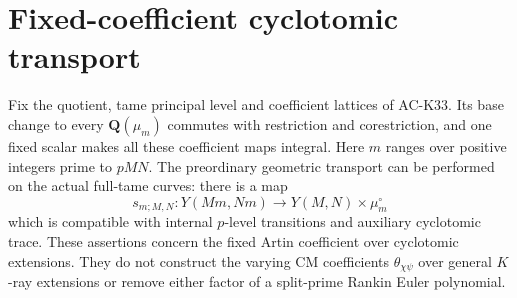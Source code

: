 \section{Fixed-coefficient cyclotomic transport}

\begin{proposition}
Fix the quotient, tame principal level and coefficient lattices of
AC-K33.  Its base change to every \(\mathbf Q(\mu_m)\) commutes
with restriction and corestriction, and one fixed scalar makes all
these coefficient maps integral.  Here \(m\) ranges over positive
integers prime to \(pMN\).  The preordinary geometric transport can
be performed on the actual full-tame curves: there is a map
\[
 s_{m;M,N}:Y(Mm,Nm)\longrightarrow
       Y(M,N)\times\mu_m^\circ
\]
which is compatible with internal \(p\)-level transitions and
auxiliary cyclotomic trace.  These assertions concern the fixed
Artin coefficient over cyclotomic extensions.  They do not construct
the varying CM coefficients \(\theta_{\chi\psi}\) over general
\(K\)-ray extensions or remove either factor of a split-prime
Rankin Euler polynomial.
\end{proposition}

